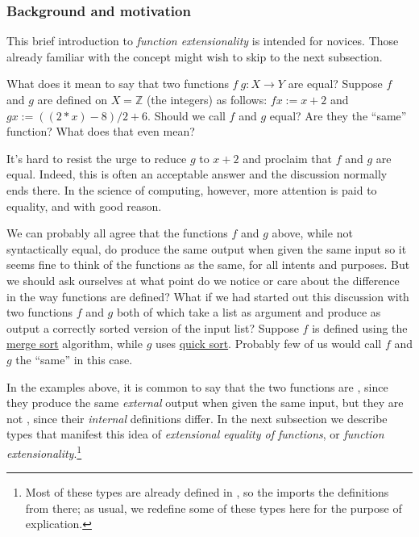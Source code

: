 \subsubsection{Background and motivation}\label{background-and-motivation}
This brief introduction to \emph{function extensionality} is intended for novices. Those already familiar with the concept might wish to skip to the next subsection.

What does it mean to say that two functions \(f\ g \colon X → Y\) are equal? Suppose $f$ and \(g\) are defined on \(X = ℤ\) (the integers) as follows: \(f x := x + 2\) and \(g x := ((2 * x) - 8)/2 + 6\). Should we call \(f\) and \(g\) equal?  Are they the ``same'' function?  What does that even mean?

It's hard to resist the urge to reduce \(g\) to \(x + 2\) and proclaim that \(f\) and \(g\) are equal. Indeed, this is often an acceptable answer and the discussion normally ends there.  In the science of computing, however, more attention is paid to equality, and with good reason.

We can probably all agree that the functions \(f\) and \(g\) above, while not syntactically equal, do produce the same output when given the same input so it seems fine to think of the functions as the same, for all intents and purposes. But we should ask ourselves at what point do we notice or care about the difference in the way functions are defined? What if we had started out this discussion with two functions \(f\) and \(g\) both of which take a list as argument and produce as output a correctly sorted version of the input list?  Suppose \(f\) is defined using the \href{https://en.wikipedia.org/wiki/Merge_sort}{merge sort} algorithm, while \(g\) uses \href{https://en.wikipedia.org/wiki/Quicksort}{quick sort}. Probably few of us would call \(f\) and \(g\) the ``same'' in this case.

In the examples above, it is common to say that the two functions are \href{https://en.wikipedia.org/wiki/Extensionality}{}, since they produce the same \emph{external} output when given the same input, but they are not \href{https://en.wikipedia.org/wiki/Intension}{}, since their \emph{internal} definitions differ. In the next subsection we describe types that manifest this idea of \emph{extensional equality of functions}, or \emph{function extensionality}.\footnote{Most of these types are already defined in \typtop, so the \ualib imports the definitions from there; as usual, we redefine some of these types here for the purpose of explication.}


